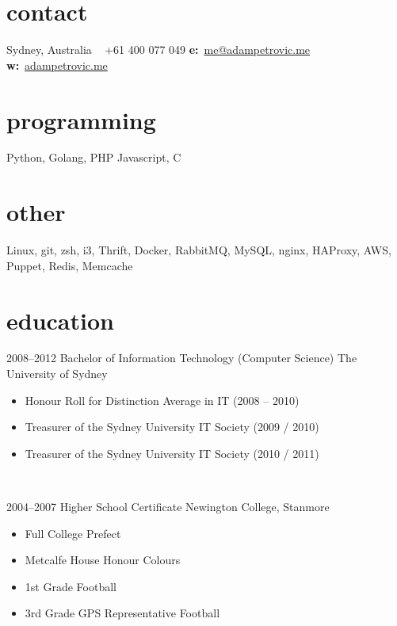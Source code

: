 \documentclass[]{friggeri-cv} %
\begin{document}


\begin{aside} %
\section{contact}
Sydney, Australia
~
+61 400 077 049
\textbf{e:}~\href{mailto:me@adampetrovic.me}{me@adampetrovic.me}
\textbf{w:}~\href{http://www.adampetrovic.me}{adampetrovic.me}
\section{programming}
Python, Golang, PHP
Javascript, C
\section{other}
Linux, git, zsh, i3, Thrift, Docker, RabbitMQ, MySQL, nginx, HAProxy, AWS, Puppet, Redis, Memcache
\end{aside}


\section{education}

\begin{entrylist}
\entry
{2008--2012}
{Bachelor of Information Technology (Computer Science)}
{The University of Sydney}
{
    \begin{itemize}
        \item Honour Roll for Distinction Average in IT (2008 – 2010)
        \item Treasurer of the Sydney University IT Society (2009 / 2010)
        \item Treasurer of the Sydney University IT Society (2010 / 2011)
    \end{itemize}
    ~
}
\entry
{2004--2007}
{Higher School Certificate}
{Newington College, Stanmore}
{
    \begin{itemize}
        \item Full College Prefect
        \item Metcalfe House Honour Colours
        \item 1st Grade Football
        \item 3rd Grade GPS Representative Football
    \end{itemize}
}
\end{entrylist}
\end{document}
